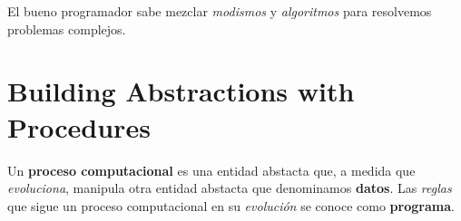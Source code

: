 El bueno programador sabe mezclar \textit{modismos} y \textit{algoritmos} para resolvemos problemas complejos.


\section{Building Abstractions with Procedures}

Un \textbf{proceso computacional} es una entidad abstacta que,
a medida que \textit{evoluciona},
manipula otra entidad abstacta que denominamos \textbf{datos}.
Las \textit{reglas} que sigue un proceso computacional 
en su \textit{evolución} se conoce como 
\textbf{programa}.